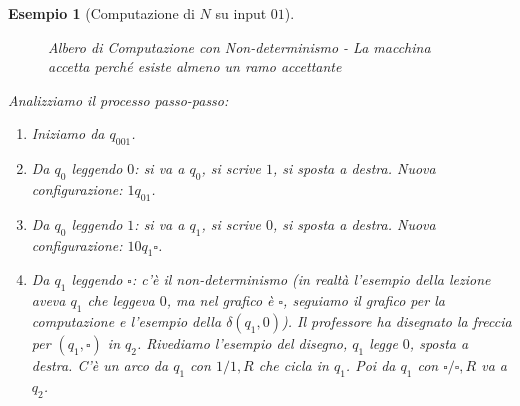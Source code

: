 \documentclass[a4paper]{article}
\newtheorem{example}{Esempio}
\newcommand{\blankS}{\ensuremath{\square}}
\begin{document}
\begin{example}[Computazione di $N$ su input $01$]
\begin{figure}[h!]
    \caption{Albero di Computazione con Non-determinismo - La macchina accetta perché esiste almeno un ramo accettante}
\end{figure}
Analizziamo il processo passo-passo:
\begin{enumerate}
    \item Iniziamo da $q_001$.
    \item Da $q_0$ leggendo $0$: si va a $q_0$, si scrive $1$, si sposta a destra. Nuova configurazione: $1q_01$.
    \item Da $q_0$ leggendo $1$: si va a $q_1$, si scrive $0$, si sposta a destra. Nuova configurazione: $10q_1\blankS$.
    \item Da $q_1$ leggendo $\blankS$: c'è il non-determinismo (in realtà l'esempio della lezione aveva $q_1$ che leggeva $0$, ma nel grafico è $\blankS$, seguiamo il grafico per la computazione e l'esempio della $\delta(q_1,0)$). Il professore ha disegnato la freccia per $(q_1, \blankS)$ in $q_2$. Rivediamo l'esempio del disegno, $q_1$ legge $0$, sposta a destra. C'è un arco da $q_1$ con $1/1,R$ che cicla in $q_1$. Poi da $q_1$ con $\blankS/\blankS,R$ va a $q_2$.
    

\end{enumerate}
\end{example}
\end{document}
